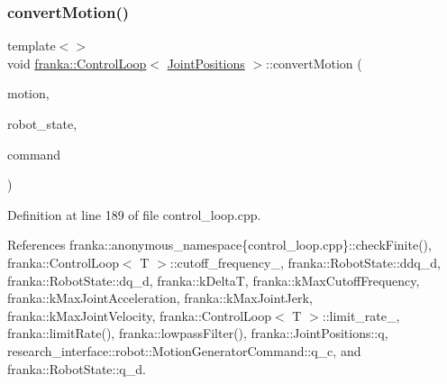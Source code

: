 \subsubsection{\texorpdfstring{convert\+Motion()}{convertMotion()}\hspace{0.1cm}{\footnotesize\ttfamily [2/5]}}
{\footnotesize\ttfamily template$<$$>$ \\
void \hyperlink{classfranka_1_1ControlLoop}{franka\+::\+Control\+Loop}$<$ \hyperlink{classfranka_1_1JointPositions}{Joint\+Positions} $>$\+::convert\+Motion (\begin{DoxyParamCaption}\item[{const \hyperlink{classfranka_1_1JointPositions}{Joint\+Positions} \&}]{motion,  }\item[{const \hyperlink{structfranka_1_1RobotState}{Robot\+State} \&}]{robot\+\_\+state,  }\item[{\hyperlink{structresearch__interface_1_1robot_1_1MotionGeneratorCommand}{research\+\_\+interface\+::robot\+::\+Motion\+Generator\+Command} $\ast$}]{command }\end{DoxyParamCaption})\hspace{0.3cm}{\ttfamily [private]}}



Definition at line 189 of file control\+\_\+loop.\+cpp.



References franka\+::anonymous\+\_\+namespace\{control\+\_\+loop.\+cpp\}\+::check\+Finite(), franka\+::\+Control\+Loop$<$ T $>$\+::cutoff\+\_\+frequency\+\_\+, franka\+::\+Robot\+State\+::ddq\+\_\+d, franka\+::\+Robot\+State\+::dq\+\_\+d, franka\+::k\+DeltaT, franka\+::k\+Max\+Cutoff\+Frequency, franka\+::k\+Max\+Joint\+Acceleration, franka\+::k\+Max\+Joint\+Jerk, franka\+::k\+Max\+Joint\+Velocity, franka\+::\+Control\+Loop$<$ T $>$\+::limit\+\_\+rate\+\_\+, franka\+::limit\+Rate(), franka\+::lowpass\+Filter(), franka\+::\+Joint\+Positions\+::q, research\+\_\+interface\+::robot\+::\+Motion\+Generator\+Command\+::q\+\_\+c, and franka\+::\+Robot\+State\+::q\+\_\+d.


